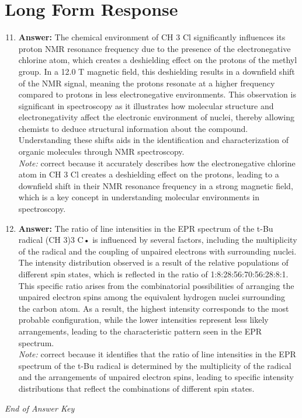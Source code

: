 \documentclass[12pt]{article}
\begin{document}
\section*{Long Form Response}
\begin{enumerate}[label=\arabic*.]
\setcounter{enumi}{10}
\item \textbf{Answer:} The chemical environment of CH 3 Cl significantly influences its proton NMR resonance frequency due to the presence of the electronegative chlorine atom, which creates a deshielding effect on the protons of the methyl group. In a 12.0 T magnetic field, this deshielding results in a downfield shift of the NMR signal, meaning the protons resonate at a higher frequency compared to protons in less electronegative environments. This observation is significant in spectroscopy as it illustrates how molecular structure and electronegativity affect the electronic environment of nuclei, thereby allowing chemists to deduce structural information about the compound. Understanding these shifts aids in the identification and characterization of organic molecules through NMR spectroscopy.
\\ \textit{Note:} correct because it accurately describes how the electronegative chlorine atom in CH 3 Cl creates a deshielding effect on the protons, leading to a downfield shift in their NMR resonance frequency in a strong magnetic field, which is a key concept in understanding molecular environments in spectroscopy.
\item \textbf{Answer:} The ratio of line intensities in the EPR spectrum of the t-Bu radical (CH 3)3 C• is influenced by several factors, including the multiplicity of the radical and the coupling of unpaired electrons with surrounding nuclei. The intensity distribution observed is a result of the relative populations of different spin states, which is reflected in the ratio of 1:8:28:56:70:56:28:8:1. This specific ratio arises from the combinatorial possibilities of arranging the unpaired electron spins among the equivalent hydrogen nuclei surrounding the carbon atom. As a result, the highest intensity corresponds to the most probable configuration, while the lower intensities represent less likely arrangements, leading to the characteristic pattern seen in the EPR spectrum.
\\ \textit{Note:} correct because it identifies that the ratio of line intensities in the EPR spectrum of the t-Bu radical is determined by the multiplicity of the radical and the arrangements of unpaired electron spins, leading to specific intensity distributions that reflect the combinations of different spin states.
\end{enumerate}

\vfill
\noindent\textit{End of Answer Key}
\end{document}

